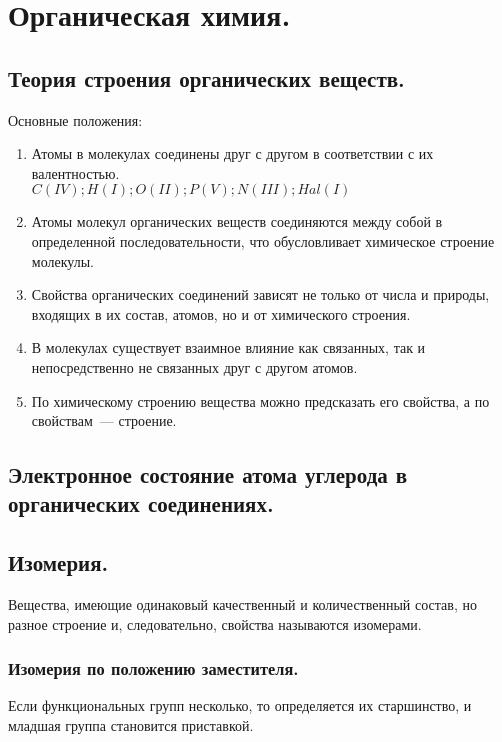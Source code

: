 \documentclass[12pt]{article}
\begin{document}
	\tableofcontents
	\setcounter{tocdepth}{3}
	\newpage
	\section{Органическая химия.}
	\subsection{Теория строения органических веществ.}
	\begin{definition}
		Основные положения:
		\begin{enumerate}
			\item Атомы в молекулах соединены друг с другом в соответствии с их валентностью. \\
			$C (IV); H (I); O (II); P (V); N (III); Hal (I)$
			\item Атомы молекул органических веществ соединяются между собой в определенной последовательности, что обусловливает химическое строение молекулы.
			\item Свойства органических соединений зависят не только от числа и природы, входящих в их состав, атомов, но и от химического строения.
			\item В молекулах существует взаимное влияние как связанных, так и непосредственно не связанных друг с другом атомов.
			\item По химическому строению вещества можно предсказать его свойства, а по свойствам~--- строение.
		\end{enumerate}
	\end{definition}
	\subsection{Электронное состояние атома углерода в органических соединениях.}
	\subsection{Изомерия.}
	\begin{definition}
		Вещества, имеющие одинаковый качественный и количественный состав, но разное строение и, следовательно, свойства называются изомерами.
	\end{definition}
	\subsubsection{Изомерия по положению заместителя.}
	\begin{note}
		Если функциональных групп несколько, то определяется их старшинство, и младшая группа становится приставкой.
	\end{note}
\end{document}
